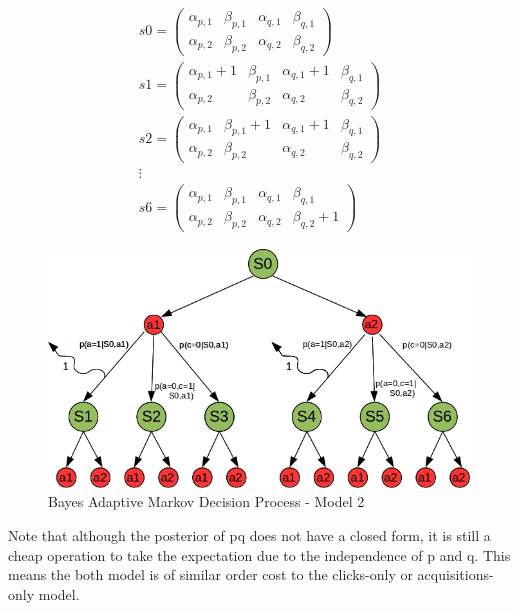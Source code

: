 \documentclass[11pt,a4,singlespacing,titlepagenumber=on]{scrreprt}
\numberwithin{equation}{chapter} %
\theoremstyle{remark}
\begin{document}
\begin{align}
s0 =
 \begin{pmatrix}
  \alpha_{p,1} & \beta_{p,1} & \alpha_{q,1} & \beta_{q,1} \\
  \alpha_{p,2} & \beta_{p,2} & \alpha_{q,2} & \beta_{q,2} 
 \end{pmatrix} \\
s1 =
  \begin{pmatrix}
   \alpha_{p,1}+1 & \beta_{p,1} & \alpha_{q,1}+1 & \beta_{q,1} \\
   \alpha_{p,2} & \beta_{p,2} & \alpha_{q,2} & \beta_{q,2} 
  \end{pmatrix} \\
s2 =
  \begin{pmatrix}
   \alpha_{p,1} & \beta_{p,1}+1 & \alpha_{q,1}+1 & \beta_{q,1} \\
   \alpha_{p,2} & \beta_{p,2} & \alpha_{q,2} & \beta_{q,2} 
  \end{pmatrix} \\
\vdots \\
s6 =
  \begin{pmatrix}
   \alpha_{p,1} & \beta_{p,1} & \alpha_{q,1} & \beta_{q,1} \\
   \alpha_{p,2} & \beta_{p,2} & \alpha_{q,2} & \beta_{q,2}+1 
  \end{pmatrix}
\end{align} 

\begin{figure}[H]
    \centering
    \includegraphics[scale=0.6]{BAMDP.jpg}
    \caption{ Bayes Adaptive Markov Decision Process - Model 2 }
\end{figure}


Note that although the posterior of pq does not have a closed form, it is still a cheap operation to take the expectation due to the independence of p and q. This means the both model is of similar order cost to the clicks-only or acquisitions-only model.
\end{document}
